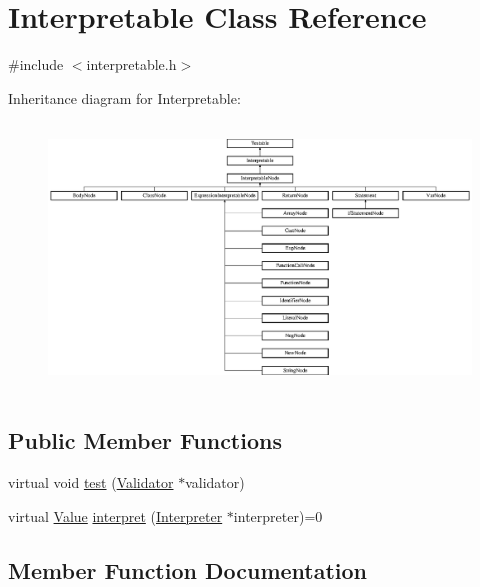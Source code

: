 \hypertarget{classInterpretable}{}\section{Interpretable Class Reference}
\label{classInterpretable}


{\ttfamily \#include $<$interpretable.\+h$>$}

Inheritance diagram for Interpretable\+:\begin{figure}[H]
\begin{center}
\leavevmode
\includegraphics[height=7.140255cm]{classInterpretable}
\end{center}
\end{figure}
\subsection*{Public Member Functions}
\begin{DoxyCompactItemize}
\item 
virtual void \hyperlink{classInterpretable_a32f547aaf68dcbab993284d3257ab010}{test} (\hyperlink{classValidator}{Validator} $\ast$validator)
\item 
virtual \hyperlink{classValue}{Value} \hyperlink{classInterpretable_aa4503765d6dbd00bff7beda913f112ee}{interpret} (\hyperlink{classInterpreter}{Interpreter} $\ast$interpreter)=0
\end{DoxyCompactItemize}


\subsection{Member Function Documentation}
\mbox{\label{classInterpretable_aa4503765d6dbd00bff7beda913f112ee}} 
